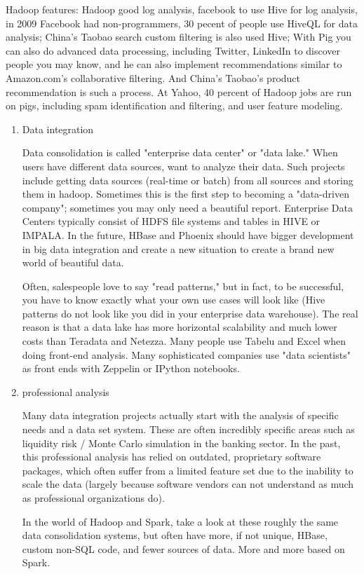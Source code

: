 \documentclass[sigconf]{acmart}
\begin{document}
\par Hadoop features: Hadoop good log analysis, facebook to use Hive for log analysis, in 2009 Facebook had non-programmers, 30 pecent of people use HiveQL for data analysis; China's Taobao search custom filtering is also used Hive; With Pig you can also do advanced data processing, including Twitter, LinkedIn to discover people you may know, and he can also implement recommendations similar to Amazon.com's collaborative filtering.\cite{Standford} And China's Taobao's product recommendation is such a process. At Yahoo, 40 percent of Hadoop jobs are run on pigs, including spam identification and filtering, and user feature modeling.\cite{Standford}

\begin{enumerate}
  \item  Data integration
  \par Data consolidation is called "enterprise data center" or "data lake." When users have different data sources, want to analyze their data. Such projects include getting data sources (real-time or batch) from all sources and storing them in hadoop.\cite{Standford} Sometimes this is the first step to becoming a "data-driven company"; sometimes you may only need a beautiful report. Enterprise Data Centers typically consist of HDFS file systems and tables in HIVE or IMPALA. In the future, HBase and Phoenix should have bigger development in big data integration and create a new situation to create a brand new world of beautiful data.\cite{Standford}
  \par  Often, salespeople love to say "read patterns," but in fact, to be successful, you have to know exactly what your own use cases will look like (Hive patterns do not look like you did in your enterprise data warehouse).\cite{Standford} The real reason is that a data lake has more horizontal scalability and much lower costs than Teradata and Netezza. Many people use Tabelu and Excel when doing front-end analysis.\cite{Standford} Many sophisticated companies use "data scientists" as front ends with Zeppelin or IPython notebooks.

  \item professional analysis
  \par Many data integration projects actually start with the analysis of specific needs and a data set system. These are often incredibly specific areas such as liquidity risk / Monte Carlo simulation in the banking sector.\cite{Zhou2017} In the past, this professional analysis has relied on outdated, proprietary software packages, which often suffer from a limited feature set due to the inability to scale the data (largely because software vendors can not understand as much as professional organizations do).\cite{Zhou2017}
  \par  In the world of Hadoop and Spark, take a look at these roughly the same data consolidation systems, but often have more, if not unique, HBase, custom non-SQL code, and fewer sources of data. More and more based on Spark.



\end{enumerate}
\end{document}
